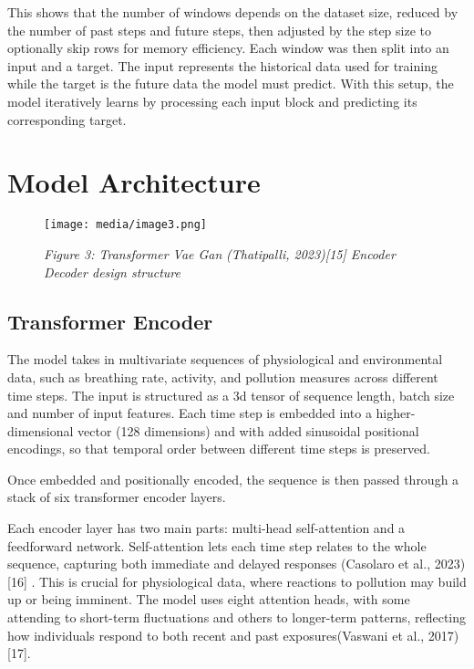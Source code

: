 \documentclass[12pt,a4paper]{report}
\begin{document}
This shows that the number of windows depends on the dataset size,
reduced by the number of past steps and future steps, then adjusted by
the step size to optionally skip rows for memory efficiency. Each window
was then split into an input and a target. The input represents the
historical data used for training while the target is the future data
the model must predict. With this setup, the model iteratively learns by
processing each input block and predicting its corresponding target.

\section{Model Architecture}

\begin{figure}[h!]
    \centering
    \texttt{[image: media/image3.png]}
    \caption*{\emph{Figure 3: Transformer Vae Gan} \emph{(Thatipalli, 2023){[}15{]}
Encoder Decoder design structure}}
\end{figure}



\subsection{Transformer Encoder}
The model takes in multivariate sequences of physiological and
environmental data, such as breathing rate, activity, and pollution
measures across different time steps. The input is structured as a 3d
tensor of sequence length, batch size and number of input features. Each
time step is embedded into a higher-dimensional vector (128 dimensions)
and with added sinusoidal positional encodings, so that temporal order
between different time steps is preserved.

Once embedded and positionally encoded, the sequence is then passed
through a stack of six transformer encoder layers.

Each encoder layer has two main parts: multi-head self-attention and a
feedforward network. Self-attention lets each time step relates to the whole
sequence, capturing both immediate and delayed responses (Casolaro et
al., 2023){[}16{]} . This is crucial for physiological data, where
reactions to pollution may build up or being imminent. The model uses eight
attention heads, with some attending to short-term fluctuations and
others to longer-term patterns, reflecting how individuals respond to
both recent and past exposures(Vaswani et al., 2017){[}17{]}.
\end{document}
